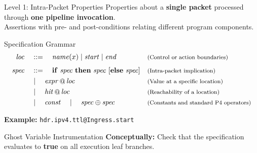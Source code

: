 \documentclass[aspectratio=169]{beamer}
\begin{document}
\begin{frame}{Level 1: Intra-Packet Properties}
  Properties about a \textbf{single packet} processed through \textbf{one pipeline invocation}.\\
  Assertions with pre- and post-conditions relating different program components.

  \vspace{0.5em}
  \begin{block}{Specification Grammar}
    \small
    \vspace{-1.5em}
    \begin{align*}
      \mathit{loc} \quad &::= \quad \mathit{name}(x) \mid \mathit{start} \mid \mathit{end} && \text{\footnotesize (Control or action boundaries)} \\[4pt]
      \mathit{spec} \quad &::= \quad \mathbf{if}\ \mathit{spec}\ \mathbf{then}\ \mathit{spec}\ [\mathbf{else}\ \mathit{spec}] && \text{\footnotesize (Intra-packet implication)} \\
                          &\mid \quad \mathit{expr} \mathop{@} \mathit{loc} && \text{\footnotesize (Value at a specific location)} \\
                          &\mid \quad \mathit{hit} \mathop{@} \mathit{loc} && \text{\footnotesize (Reachability of a location)} \\
                          &\mid \quad \mathit{const} \quad\mid\quad \mathit{spec} \oplus \mathit{spec} && \text{\footnotesize (Constants and standard P4 operators)}
    \end{align*}
  \end{block}

  \vspace{0.1em}
  \textbf{Example:} \texttt{hdr.ipv4.ttl@Ingress.start}

  \vspace{0.5em}
  \begin{block}{Ghost Variable Instrumentation}
    \small
    \textbf{Conceptually:} Check that the specification evaluates to \textbf{true} on all execution leaf branches.
  \end{block}
\end{frame}

\end{document}
